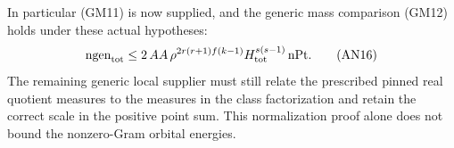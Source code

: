 In particular (GM11) is now supplied, and the generic mass
comparison (GM12) holds under these actual hypotheses:
\[
 \mathrm{ngen}_{\rm tot}\le
 2\,AA\,\rho^{2r(r+1)f(k-1)}H_{\rm tot}^{s(s-1)}\,\mathrm{nPt}.
                                                               \tag{AN16}
\]
The remaining generic local supplier must still relate the
prescribed pinned real quotient measures to the measures
in the class factorization and retain the correct scale
in the positive point sum. This normalization proof alone
does not bound the nonzero-Gram orbital energies.
